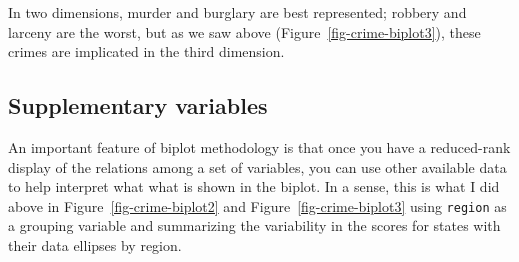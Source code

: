 \documentclass[
  letterpaper,
  10pt,
  krantz2]{krantz}
\makeatletter
\newenvironment{Shaded}{\begin{snugshade}}{\end{snugshade}}
\newcommand{\AttributeTok}[1]{\textcolor[rgb]{0.40,0.45,0.13}{#1}}
\newcommand{\CommentTok}[1]{\textcolor[rgb]{0.37,0.37,0.37}{#1}}
\newcommand{\DecValTok}[1]{\textcolor[rgb]{0.68,0.00,0.00}{#1}}
\newcommand{\FunctionTok}[1]{\textcolor[rgb]{0.28,0.35,0.67}{#1}}
\newcommand{\NormalTok}[1]{\textcolor[rgb]{0.00,0.23,0.31}{#1}}
\newcommand{\OtherTok}[1]{\textcolor[rgb]{0.00,0.23,0.31}{#1}}
\newcommand{\SpecialCharTok}[1]{\textcolor[rgb]{0.37,0.37,0.37}{#1}}
\newenvironment{kframe}{%
  \medskip{}
  \setlength{\fboxsep}{.8em}
  \def\at@end@of@kframe{}%
  \ifinner\ifhmode%
  \def\at@end@of@kframe{\end{minipage}}%
  \begin{minipage}{\columnwidth}%
  \fi\fi%
  \def\FrameCommand##1{\hskip\@totalleftmargin \hskip-\fboxsep
  \colorbox{shadecolor}{##1}\hskip-\fboxsep
      \hskip-\linewidth \hskip-\@totalleftmargin \hskip\columnwidth}%
  \MakeFramed {\advance\hsize-\width
    \@totalleftmargin\z@ \linewidth\hsize
    \@setminipage}}%
{\par\unskip\endMakeFramed%
  \at@end@of@kframe}
\renewenvironment{Shaded}{\begin{kframe}}{\end{kframe}}
\makeatother
\begin{document}
\begin{Shaded}
\end{Shaded}

In two dimensions, murder and burglary are best represented; robbery and
larceny are the worst, but as we saw above
(Figure~\ref{fig-crime-biplot3}), these crimes are implicated in the
third dimension.

\hypertarget{sec-supp-vars}{%
\subsection{Supplementary variables}\label{sec-supp-vars}}

An important feature of biplot methodology is that once you have a
reduced-rank display of the relations among a set of variables, you can
use other available data to help interpret what what is shown in the
biplot. In a sense, this is what I did above in
Figure~\ref{fig-crime-biplot2} and Figure~\ref{fig-crime-biplot3} using
\texttt{region} as a grouping variable and summarizing the variability
in the scores for states with their data ellipses by region.
\end{document}
